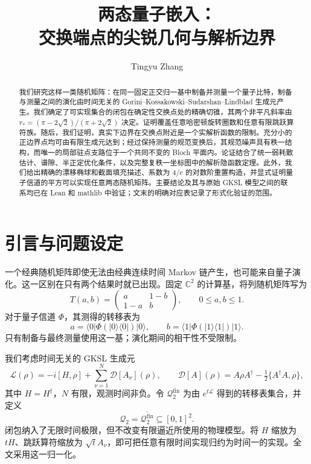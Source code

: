 \documentclass[UTF8,11pt,a4paper,fontset=fandol]{ctexart}
\title{两态量子嵌入：\\交换端点的尖锐几何与解析边界}
\author{Tingyu Zhang}
\date{}
\theoremstyle{definition}
\theoremstyle{remark}
\newcommand{\Q}{\mathcal Q_2}
\newcommand{\Diss}{\mathcal D}
\newcommand{\C}{\mathbb C}
\begin{document}
\maketitle
\begin{abstract}
我们研究这样一类随机矩阵：在同一固定正交归一基中制备并测量一个量子比特，制备与测量之间的演化由时间无关的 Gorini--Kossakowski--Sudarshan--Lindblad 生成元产生。我们确定了可实现集合的闭包在确定性交换点处的精确切锥，其两个非平凡斜率由
\(r_*=(\pi-2\sqrt2)/(\pi+2\sqrt2)\)
决定。证明覆盖任意哈密顿旋转圈数和任意有限跳跃算符族。随后，我们证明，真实下边界在交换点附近是一个实解析函数的限制。充分小的正边界点均可由有限生成元达到；经过保持测量的规范变换后，其规范噪声具有秩一结构，而唯一的局部驻点支路位于一个共同不变的 Bloch 平面内。论证结合了统一弱耗散估计、谱隙、半正定优化条件，以及完整复秩一坐标图中的解析隐函数定理。此外，我们给出精确的漂移椭球和截面填充描述、系数为 \(4/e\) 的对数阶重置构造，并显式证明量子信道的平方可以实现任意两态随机矩阵。主要结论及其与原始 GKSL 模型之间的联系均已在 Lean 和 mathlib 中验证；文末的明确对应表记录了形式化验证的范围。
\end{abstract}

\section{引言与问题设定}\label{sec:introduction}

一个经典随机矩阵即使无法由经典连续时间 Markov 链产生，也可能来自量子演化。这一区别在只有两个结果时就已出现。固定 \(\C^2\) 的计算基，将列随机矩阵写为
\begin{equation}\label{eq:stochastic}
 T(a,b)=\begin{pmatrix}a&1-b\\1-a&b\end{pmatrix},\qquad 0\leq a,b\leq1.
\end{equation}
对于量子信道 \(\Phi\)，其测得的转移表为
\begin{equation}\label{eq:readout}
 a=\langle0|\Phi(|0\rangle\langle0|)|0\rangle,
 \qquad b=\langle1|\Phi(|1\rangle\langle1|)|1\rangle.
\end{equation}
只有制备与最终测量使用这一基；演化期间的相干性不受限制。

我们考虑时间无关的 GKSL 生成元 \cite{GKS1976,Lindblad1976}
\begin{equation}\label{eq:gksl}
 \mathcal L(\rho)=-i[H,\rho]+\sum_{\nu=1}^N\Diss[A_\nu](\rho),\qquad
 \Diss[A](\rho)=A\rho A^\dagger-\tfrac12\{A^\dagger A,\rho\},
\end{equation}
其中 \(H=H^\dagger\)，\(N\) 有限，观测时间非负。令 \(\mathcal Q_2^{\mathrm{fin}}\) 为由 \(e^{t\mathcal L}\) 得到的转移表集合，并定义
\begin{equation}\label{eq:Qdefinition}
 \Q=\overline{\mathcal Q_2^{\mathrm{fin}}}\subseteq[0,1]^2.
\end{equation}
闭包纳入了无限时间极限，但不改变有限逼近所使用的物理模型。将 \(H\) 缩放为 \(tH\)、跳跃算符缩放为 \(\sqrt t A_\nu\)，即可把任意有限时间实现归约为时间一的实现。全文采用这一归一化。
\end{document}
